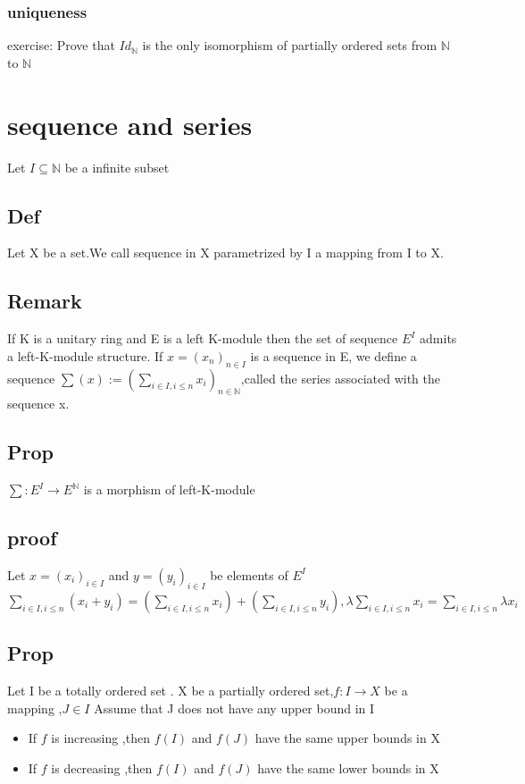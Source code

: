 \documentclass{book}
\begin{document}
\subsection{uniqueness}
exercise: Prove that $Id_\mathbb{N}$ is the only isomorphism of partially ordered sets from $\mathbb{N} $ to $\mathbb{N} $
\chapter{sequence and series}
Let $I\subseteq \mathbb{N}$ be a infinite subset
\section{Def} Let X be a set.We call sequence in X parametrized by I a mapping from I to X.
\section{Remark}
If K is a unitary ring and E is a left K-module then the set of sequence $E^I$ admits a left-K-module structure. If $x=(x_n)_{n\in I}$ is a sequence in E, we define a sequence $\sum(x):=(\sum\limits_{i\in I,i\leq n}x_i)_{n\in \mathbb{N}}$,called the series associated with the sequence x.
\section{Prop}
$\sum:E^I\rightarrow E^\mathbb{N}$ is a morphism of left-K-module
\section{proof}
Let $x=(x_i)_{i\in I}$ and $y=(y_i)_{i\in I}$ be elements of $E^I$\\
$\sum\limits_{i\in I,i\leq n}(x_i+y_i)=(\sum\limits_{i\in I,i\leq n}x_i)+(\sum\limits_{i\in I,i\leq n}y_i),\lambda\sum\limits_{i\in I,i\leq n}x_i=\sum\limits_{i\in I,i\leq n}\lambda x_i$
\section{Prop}
Let I be a totally ordered set . X be a partially ordered set,$f:I\rightarrow X$ be a mapping ,$J\in I$ Assume that J does not have any upper bound in I
\begin{itemize}
    \item If $f$ is increasing ,then $f(I)$ and $f(J)$ have the same upper bounds in X
    \item If $f$ is decreasing ,then $f(I)$ and $f(J)$ have the same lower bounds in X
\end{itemize}
\end{document}
